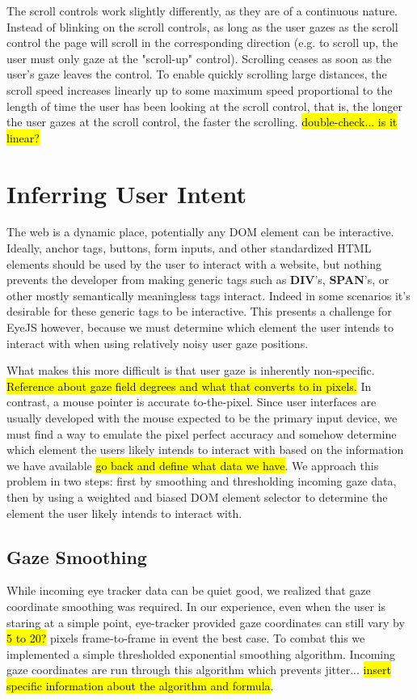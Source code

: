 \documentclass{sigchi}
\begin{document}
The scroll controls work slightly differently, as they are of a continuous nature. Instead of blinking on the scroll controls, as long as the user gazes as the scroll control the page will scroll in the corresponding direction (e.g. to scroll up, the user must only gaze at the "scroll-up" control). Scrolling ceases as soon as the user's gaze leaves the control. To enable quickly scrolling large distances, the scroll speed increases linearly up to some maximum speed proportional to the length of time the user has been looking at the scroll control, that is, the longer the user gazes at the scroll control, the faster the scrolling. \hl{double-check... is it linear?}



\section{Inferring User Intent}
The web is a dynamic place, potentially any DOM element can be interactive. Ideally, anchor tags, buttons, form inputs, and other standardized HTML elements should be used by the user to interact with a website, but nothing prevents the developer from making generic tags such as \textbf{DIV}'s, \textbf{SPAN}'s, or other mostly semantically meaningless tags interact. Indeed in some scenarios it's desirable for these generic tags to be interactive. This presents a challenge for EyeJS however, because we must determine which element the user intends to interact with when using relatively noisy user gaze positions.

What makes this more difficult is that user gaze is inherently non-specific. \hl{Reference about gaze field degrees and what that converts to in pixels.} In contrast, a mouse pointer is accurate to-the-pixel. Since user interfaces are usually developed with the mouse expected to be the primary input device, we must find a way to emulate the pixel perfect accuracy and somehow determine which element the users likely intends to interact with based on the information we have available \hl{go back and define what data we have}. We approach this problem in two steps: first by smoothing and thresholding incoming gaze data, then by using a weighted and biased DOM element selector to determine the element the user likely intends to interact with.


\subsection{Gaze Smoothing}
While incoming eye tracker data can be quiet good, we realized that gaze coordinate smoothing was required. In our experience, even when the user is staring at a simple point, eye-tracker provided gaze coordinates can still vary by \hl{5 to 20?} pixels frame-to-frame in event the best case. To combat this we implemented a simple thresholded exponential smoothing algorithm. Incoming gaze coordinates are run through this algorithm which prevents jitter... \hl{insert specific information about the algorithm and formula}.
\end{document}
